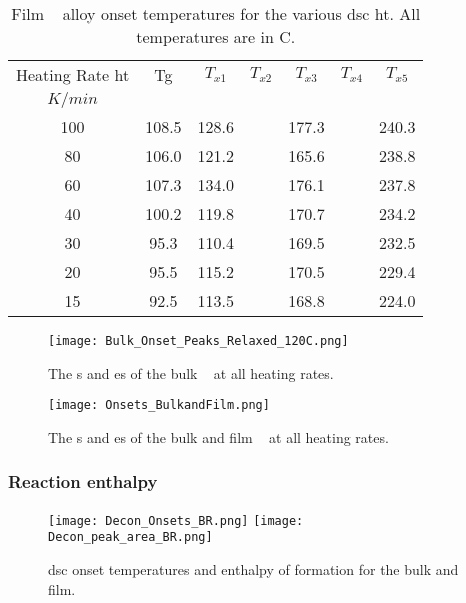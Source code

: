 \documentclass[draft,a4paper,12pt,oneside]{article}%
\begin{document}
\begin{table}[h]
	\centering
	\begin{tabular}{ c c c c c c c }
		\toprule
		Heating Rate \acrshort{ht} & \acrshort{Tg} & $T_{x1}$ & $T_{x2}$ & $T_{x3}$ & $T_{x4}$ & $T_{x5}$ \\ 
		$K/min$ & & & & & & \\
		\midrule
		100 & 108.5 & 128.6 &  & 177.3 &  & 240.3 \\
		80  & 106.0 & 121.2 &  & 165.6 &  & 238.8 \\
		60  & 107.3 & 134.0 &  & 176.1 &  & 237.8 \\
		40  & 100.2 & 119.8 &  & 170.7 &  & 234.2 \\
		30  & 95.3  & 110.4 &  & 169.5 &  & 232.5 \\
		20  & 95.5  & 115.2 &  & 170.5 &  & 229.4 \\
		15  & 92.5  & 113.5 &  & 168.8 &  & 224.0 \\
		\bottomrule
	\end{tabular}
	\caption{Film \MgZnCa~ alloy onset temperatures for the various \acrshort{dsc}  \acrshort{ht}. All temperatures are in \degree C.}
	\label{tab:FilmOnsets}
\end{table}

\begin{figure}[b]
	\centering
	\texttt{[image: Bulk\_Onset\_Peaks\_Relaxed\_120C.png]}
	\caption[Table of contents Capition]{The \Tg s and \Tx es of the bulk \MgZnCa~ at all heating rates. }%
	\label{fig:DSC_Onsets_Bulk}
\end{figure}

\begin{figure}[b]
	\centering
	\texttt{[image: Onsets\_BulkandFilm.png]}
	\caption[Table of contents Capition]{The \Tg s and \Tx es of the bulk and film \MgZnCa~ at all heating rates. }%
	\label{fig:DSC_Onsets_BulkFilm}
\end{figure}

\subsubsection{Reaction enthalpy}

\begin{figure}[b]
	\centering
	\texttt{[image: Decon\_Onsets\_BR.png]}
	\medskip
	\texttt{[image: Decon\_peak\_area\_BR.png]}
	\caption{\acrshort{dsc} onset temperatures and enthalpy of formation for the bulk and film.}
	\label{fig:DSC_Decon}
\end{figure}
\end{document}
